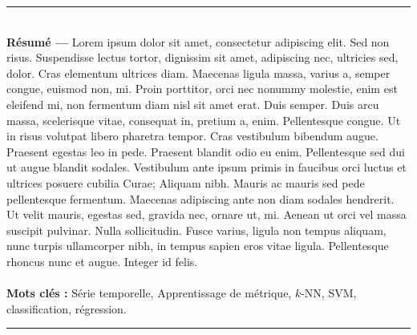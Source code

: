 \begin{vcenterpage}
\noindent\rule[2pt]{\textwidth}{0.5pt}
\\
{\large\textbf{Résumé ---}}
    Lorem ipsum dolor sit amet, consectetur adipiscing elit. Sed non risus. Suspendisse lectus tortor, dignissim sit amet, adipiscing nec, ultricies sed, dolor. Cras elementum ultrices diam. Maecenas ligula massa, varius a, semper congue, euismod non, mi. Proin porttitor, orci nec nonummy molestie, enim est eleifend mi, non fermentum diam nisl sit amet erat. Duis semper. Duis arcu massa, scelerisque vitae, consequat in, pretium a, enim. Pellentesque congue. Ut in risus volutpat libero pharetra tempor. Cras vestibulum bibendum augue. Praesent egestas leo in pede. Praesent blandit odio eu enim. Pellentesque sed dui ut augue blandit sodales. Vestibulum ante ipsum primis in faucibus orci luctus et ultrices posuere cubilia Curae; Aliquam nibh. Mauris ac mauris sed pede pellentesque fermentum. Maecenas adipiscing ante non diam sodales hendrerit. Ut velit mauris, egestas sed, gravida nec, ornare ut, mi. Aenean ut orci vel massa suscipit pulvinar. Nulla sollicitudin. Fusce varius, ligula non tempus aliquam, nunc turpis ullamcorper nibh, in tempus sapien eros vitae ligula. Pellentesque rhoncus nunc et augue. Integer id felis.
\\
\\
{\large\textbf{Mots clés :}}
    Série temporelle, Apprentissage de métrique, $k$-NN, SVM, classification, régression.
\\
\noindent\rule[2pt]{\textwidth}{0.5pt}
\vspace{0.5cm}


\end{vcenterpage}
